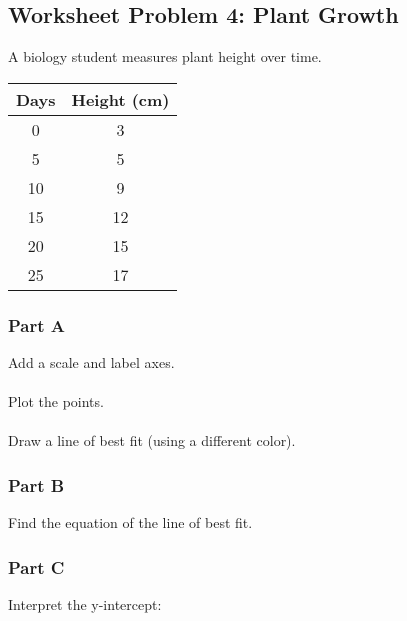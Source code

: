 \documentclass[12pt]{article}
\begin{document}
				\vspace{3cm}

				\newpage

		\subsection*{Worksheet Problem 4: Plant Growth}

			A biology student measures plant height over time.

			\begin{center}
				\begin{tabular}{|c|c|}
					\hline
					Days & Height (cm) \\
					\hline
					0 & 3 \\
					5 & 5 \\
					10 & 9 \\
					15 & 12 \\
					20 & 15 \\
					25 & 17 \\
					\hline
				\end{tabular}
			\end{center}

			\subsubsection*{Part A}
			
				Add a scale and label axes.\\\\
				Plot the points.\\\\
				Draw a line of best fit (using a different color).

				\vspace{8cm}

			\subsubsection*{Part B}
			
				Find the equation of the line of best fit.

				\newpage

			\subsubsection*{Part C}
			
				Interpret the y-intercept:

				\vspace{2cm}
\end{document}
